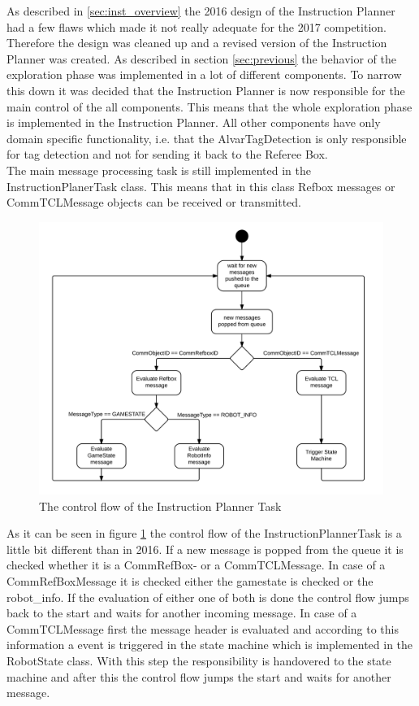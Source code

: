 As described in \ref{sec:inst_overview} the 2016 design of the Instruction Planner had a few flaws which made it not really adequate for the 2017 competition. Therefore the design was cleaned up and a revised version of the Instruction Planner was created. As described in section \ref{sec:previous} the behavior of the exploration phase was implemented in a lot of different components. To narrow this down it was decided that the Instruction Planner is now responsible for the main control of the all components. This means that the whole exploration phase is implemented in the Instruction Planner. All other components have only domain specific functionality, i.e. that the AlvarTagDetection is only responsible for tag detection and not for sending it back to the Referee Box. \\

The main message processing task is still implemented in the InstructionPlanerTask class. This means that in this class Refbox messages or CommTCLMessage objects can be received or transmitted. 


\begin{figure}[h]
\centering
\includegraphics[scale=0.25]{pic/InstructionPlannerTask.png}
\caption{The control flow of the Instruction Planner Task}
\label{fig:instructionplannertask}
\end{figure}
 
As it can be seen in figure \ref{fig:instructionplannertask} the control flow of the InstructionPlannerTask is a little bit different than in 2016. If a new message is popped from the queue it is checked whether it is a CommRefBox- or a CommTCLMessage. In case of a CommRefBoxMessage it is checked either the gamestate is checked or the robot\_info. If the evaluation of either one of both is done the control flow jumps back to the start and waits for another incoming message. In case of a CommTCLMessage first the message header is evaluated and according to this information a event is triggered in the state machine which is implemented in the RobotState class. With this step the responsibility is handovered to the state machine and after this the control flow jumps the start and waits for another message. \\ 

